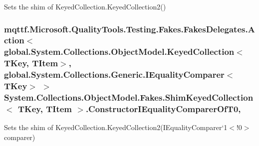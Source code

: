 Sets the shim of Keyed\-Collection{.\-Keyed\-Collection}2()

\hypertarget{class_system_1_1_collections_1_1_object_model_1_1_fakes_1_1_shim_keyed_collection_3_01_t_key_00_01_t_item_01_4_a6f2e05c6dc54f7180fad3598f01db9a1}{
\subsubsection[{Constructor\-I\-Equality\-Comparer\-Of\-T0}]{\setlength{\rightskip}{0pt plus 5cm}mqttf.\-Microsoft.\-Quality\-Tools.\-Testing.\-Fakes.\-Fakes\-Delegates.\-Action$<$global.\-System.\-Collections.\-Object\-Model.\-Keyed\-Collection$<$T\-Key, T\-Item$>$, global.\-System.\-Collections.\-Generic.\-I\-Equality\-Comparer$<$T\-Key$>$ $>$ System.\-Collections.\-Object\-Model.\-Fakes.\-Shim\-Keyed\-Collection$<$ T\-Key, T\-Item $>$.Constructor\-I\-Equality\-Comparer\-Of\-T0\hspace{0.3cm}{\ttfamily [static]}, {\ttfamily [set]}}}\label{class_system_1_1_collections_1_1_object_model_1_1_fakes_1_1_shim_keyed_collection_3_01_t_key_00_01_t_item_01_4_a6f2e05c6dc54f7180fad3598f01db9a1}


Sets the shim of Keyed\-Collection{.\-Keyed\-Collection}2(I\-Equality\-Comparer`1$<$!0$>$ comparer)

